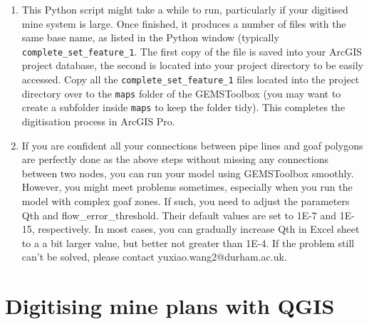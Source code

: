 \begin{enumerate}
\begin{itemize}
       \item Note that this symbol {\tt <>} for each item should be removed after you replace them using specific values.
    \end{itemize}
    One example is like: \texttt{GEMSToolbox.generate\_shapefile("pipes", -65, "goaf", "False")}

    \item This Python script might take a while to run, particularly if your digitised mine system is large. Once finished, it produces a number of files with the same base name, as listed in the Python window (typically {\tt complete\_set\_feature\_1}. The first copy of the file is saved into your ArcGIS project database, the second is located into your project directory to be easily accessed. Copy all the {\tt complete\_set\_feature\_1} files located into the project directory over to the {\tt maps} folder of the GEMSToolbox (you may want to create a subfolder inside {\tt maps} to keep the folder tidy). This completes the digitisation process in ArcGIS Pro. 

    \item If you are confident all your connections between pipe lines and goaf polygons are perfectly done as the above steps without missing any connections between two nodes, you can run your model using GEMSToolbox smoothly.  However, you might meet problems sometimes, especially when you run the model with complex goaf zones. If such, you need to adjust the parameters Qth and flow\_error\_threshold. Their default values are set to 1E-7 and 1E-15, respectively. In most cases, you can gradually increase Qth in Excel sheet to a a bit larger value, but better not greater than 1E-4. If the problem still can't be solved, please contact yuxiao.wang2@durham.ac.uk.
    
\end{enumerate}

\section{Digitising mine plans with QGIS}
